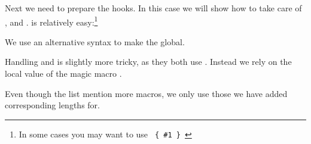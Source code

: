 \begin{sniplet}
  Next we need to prepare the hooks. In this case we will show how to
  take care of \cmd{\chapter}, \cmd{\section} and \cmd{\subsection}.
  \cmd{\chapter} is relatively easy:\footnote{In some cases you may
    want to use \texttt{%
      \{%
      \#1%
      \}%
    }}
  \begin{lcode}
    \newlength\tmplen        %
    \newlength\widestchapter %
    \renewcommand\chapternumberlinehook[1]{%
      \settowidth\tmplen{\hbox{\cftchapterfont#1}}%
      \ifdimgreater\tmplen\widestchapter{%
        \global\widestchapter=\tmplen}{}}
  \end{lcode}
  We use an alternative syntax to make the  global.

  Handling \cmd{\section} and \cmd{\subsection} is slightly more
  tricky, as they both use . Instead we rely on the
  local value of the magic macro \cmd{\cftwhatismyname}. 
  \begin{lcode}
    \newlength\widestsection
    \newlength\widestsubsection
    \renewcommand\numberlinehook[1]{%
      \forcsvlist{\ToCHookListHandler{#1}}{section,subsection,subsubsection,%
        paragraph,subparagraph,figure,table}}
    \newcommand\ToCHookListHandler[2]{%
      \edef\tmpstr{#2}%
      \ifdefstrequal{\cftwhatismyname}{\tmpstr}{%
        \settowidth\tmplen{\hbox{\csuse{cft\cftwhatismyname font}#1}}%
        \ifcslength{widest#2}{%
          \ifdimgreater\tmplen{\csuse{widest#2}}{%
            \global\csuse{widest#2}=\tmplen}{}}{}}{}}
  \end{lcode}
  Even though the list mention more macros, we only use those we have
  added corresponding lengths for.


\end{sniplet}
